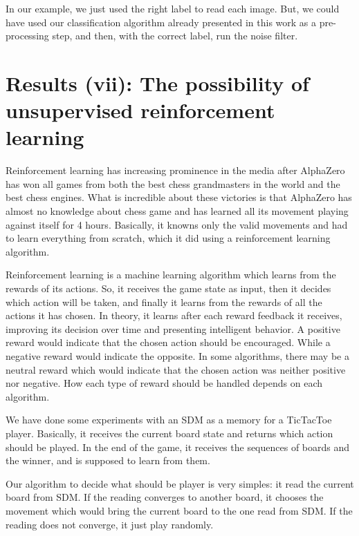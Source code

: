 In our example, we just used the right label to read each image. But, we could have used our classification algorithm already presented in this work as a pre-processing step, and then, with the correct label, run the noise filter.













\chapter{Results (vii): The possibility of unsupervised reinforcement learning}

Reinforcement learning has increasing prominence in the media after AlphaZero has won all games from both the best chess grandmasters in the world and the best chess engines. What is incredible about these victories is that AlphaZero has almost no knowledge about chess game and has learned all its movement playing against itself for 4 hours. Basically, it knowns only the valid movements and had to learn everything from scratch, which it did using a reinforcement learning algorithm.

Reinforcement learning is a machine learning algorithm which learns from the rewards of its actions. So, it receives the game state as input, then it decides which action will be taken, and finally it learns from the rewards of all the actions it has chosen. In theory, it learns after each reward feedback it receives, improving its decision over time and presenting intelligent behavior. A positive reward would indicate that the chosen action should be encouraged. While a negative reward would indicate the opposite. In some algorithms, there may be a neutral reward which would indicate that the chosen action was neither positive nor negative. How each type of reward should be handled depends on each algorithm.

We have done some experiments with an SDM as a memory for a TicTacToe player. Basically, it receives the current board state and returns which action should be played. In the end of the game, it receives the sequences of boards and the winner, and is supposed to learn from them.

Our algorithm to decide what should be player is very simples: it read the current board from SDM. If the reading converges to another board, it chooses the movement which would bring the current board to the one read from SDM. If the reading does not converge, it just play randomly.

